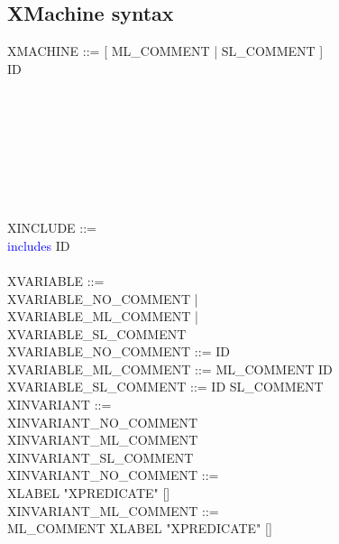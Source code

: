 \subsection{XMachine syntax}
\label{sec:xmachine-syntax}
\begin{center}
  \begin{Bcode}
    XMACHINE ::= [ ML_COMMENT | SL_COMMENT ]\\
    \Btab \Btab \Bmachine{} ID \\
    \Btab {}\\
    \Btab \Btab [\Brefines{} ID]\\
    \Btab \Btab [\Bsees{} ID \{ ID \}]\\
    \Btab {}\\
    \Btab {}\\
    \Btab {}\\
    \Btab {} \\
    \Btab \Btab \Bend \\
    XINCLUDE ::= \\
    \Btab \Btab \textcolor{blue}{includes} ID\\
    \Btab {}\\
    XVARIABLE ::= \\
    \Btab \Btab XVARIABLE\_NO\_COMMENT | \\
    \Btab \Btab XVARIABLE\_ML\_COMMENT | \\
    \Btab \Btab XVARIABLE\_SL\_COMMENT \\
    XVARIABLE\_NO\_COMMENT ::= ID \\
    XVARIABLE\_ML\_COMMENT ::= ML\_COMMENT ID \\
    XVARIABLE\_SL\_COMMENT ::= ID SL\_COMMENT \\
    XINVARIANT ::=\\
    \Btab \Btab XINVARIANT\_NO\_COMMENT\\
    \Btab \Btab XINVARIANT\_ML\_COMMENT\\
    \Btab \Btab XINVARIANT\_SL\_COMMENT\\
    XINVARIANT\_NO\_COMMENT ::= \\
    \Btab \Btab XLABEL "XPREDICATE" [\Btheorem] \\
    XINVARIANT\_ML\_COMMENT ::= \\
    \Btab \Btab ML\_COMMENT XLABEL "XPREDICATE" [\Btheorem]\\

\end{Bcode}
\end{center}
